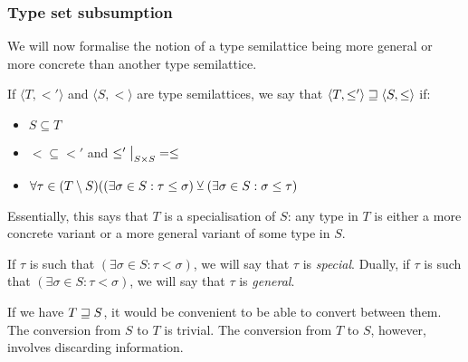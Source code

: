 \documentclass[main.tex]{subfiles}
\begin{document}
\subsubsection{Type set subsumption}
We will now formalise the notion of a type semilattice being more general
or more concrete than another type semilattice.

\begin{defn}
    If $\langle T, \less' \rangle$ and $\langle S, \less \rangle$
    are type semilattices, we say that $\langle T, \leq' \rangle \sqsupseteq \langle S, \leq \rangle$ if:
    \begin{itemize}
        \item $S \subseteq T$
        \item $\less \subseteq \less'$ and $\restr{\less'}{S \times S} = \less$
        \item $\forall \tau \in (T \setminus S) ((\exists \sigma \in S : \tau \leq \sigma )
            \veebar (\exists \sigma \in S : \sigma \leq \tau)$
    \end{itemize}
\end{defn}

Essentially, this says that $T$ is a specialisation of $S$: any type in
$T$ is either a more concrete variant or a more general variant of some type in $S$.

If $\tau$ is such that $(\exists \sigma \in S : \tau \less \sigma)$, we will
say that $\tau$ is \emph{special}. Dually, if $\tau$ is such that
$(\exists \sigma \in S : \tau \less \sigma)$, we will say that $\tau$ is
\emph{general}.

If we have $T \sqsupseteq S$, it would be convenient to be able to convert between them.
The conversion from $S$ to $T$ is trivial. The conversion from $T$ to $S$,
however, involves discarding information.

\end{document}
